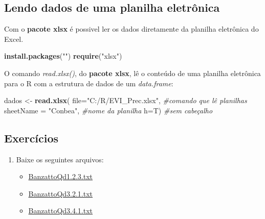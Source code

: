 \documentclass[
]{book}
\newenvironment{Shaded}{\begin{snugshade}}{\end{snugshade}}
\newcommand{\CommentTok}[1]{\textcolor[rgb]{0.56,0.35,0.01}{\textit{#1}}}
\newcommand{\DataTypeTok}[1]{\textcolor[rgb]{0.13,0.29,0.53}{#1}}
\newcommand{\KeywordTok}[1]{\textcolor[rgb]{0.13,0.29,0.53}{\textbf{#1}}}
\newcommand{\NormalTok}[1]{#1}
\newcommand{\StringTok}[1]{\textcolor[rgb]{0.31,0.60,0.02}{#1}}
\providecommand{\tightlist}{%
  \setlength{\itemsep}{0pt}\setlength{\parskip}{0pt}}
\begin{document}
\hypertarget{lendo-dados-de-uma-planilha-eletruxf4nica}{%
\subsection{Lendo dados de uma planilha eletrônica}\label{lendo-dados-de-uma-planilha-eletruxf4nica}}

Com o \textbf{pacote xlsx} é possivel ler os dados diretamente da planilha eletrônica do Excel.

\begin{Shaded}
\begin{Highlighting}[]
\KeywordTok{install.packages}\NormalTok{(}\StringTok{""}\NormalTok{)}
\KeywordTok{require}\NormalTok{(}\StringTok{"xlsx"}\NormalTok{)}
\end{Highlighting}
\end{Shaded}

O comando \emph{read.xlsx()}, do \textbf{pacote xlsx}, lê o conteúdo de uma planilha eletrônica para o R com a estrutura de dados de um \emph{data.frame}:

\begin{Shaded}
\begin{Highlighting}[]
\NormalTok{dados <-}\StringTok{ }\KeywordTok{read.xlsx}\NormalTok{(}
                    \DataTypeTok{file=}\StringTok{"C:/R/EVI_Prec.xlsx"}\NormalTok{,     }\CommentTok{#comando que lê planilhas}
                    \DataTypeTok{sheetName =} \StringTok{"Conbea"}\NormalTok{,          }\CommentTok{#nome da planilha}
                    \DataTypeTok{h=}\NormalTok{T)                           }\CommentTok{#sem cabeçalho  }
\end{Highlighting}
\end{Shaded}

\hypertarget{exercuxedcios}{%
\subsection{Exercícios}\label{exercuxedcios}}

\begin{enumerate}
\def\labelenumi{\arabic{enumi}.}
\tightlist
\item
  Baixe os seguintes arquivos:

  \begin{itemize}
  \tightlist
  \item
    \href{https://www.dropbox.com/s/uq1n2sv8an2eoan/BanzattoQd1.2.3.txt?dl=1}{BanzattoQd1.2.3.txt}
  \item
    \href{https://www.dropbox.com/s/jjyo8dhyy0qt3ft/BanzattoQd3.2.1.txt?dl=1}{BanzattoQd3.2.1.txt}
  \item
    \href{https://www.dropbox.com/s/yv5clm6qljurzbw/BanzattoQd3.4.1.txt?dl=1}{BanzattoQd3.4.1.txt}
  \end{itemize}
\end{enumerate}
\end{document}
